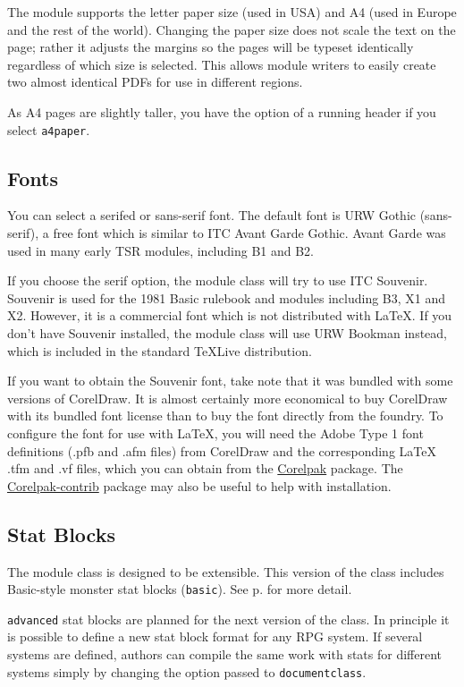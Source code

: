 \documentclass[letterpaper,serif]{module}
\begin{document}
The module supports the letter paper size (used in USA) and A4 (used in Europe and the rest of the world). Changing the paper size
does not scale the text on the page; rather it adjusts the margins so the pages will be typeset identically regardless
of which size is selected. This allows module writers to easily create two almost identical PDFs for use in different regions.

As A4 pages are slightly taller, you have the option of a running header if you select \verb|a4paper|.

\subsection*{Fonts}

You can select a serifed or sans-serif font. The default font is URW Gothic (sans-serif), a free font which is similar to
ITC Avant Garde Gothic. Avant Garde was used in many early TSR modules, including B1 and B2.

If you choose the serif option, the module class will try to use ITC Souvenir. Souvenir is used for the 1981 Basic rulebook
and modules including B3, X1 and X2. However, it is a commercial font which is not distributed with \LaTeX. If you don't have
Souvenir installed, the module class will use URW Bookman instead, which is included in the standard \TeX Live distribution.

If you want to obtain the Souvenir font, take note that it was bundled with some versions of CorelDraw.
It is almost certainly more economical to buy CorelDraw with its bundled font license than to buy the font directly from the foundry.
To configure the font for use with \LaTeX, you will need the Adobe Type 1 font definitions (.pfb and .afm files) from CorelDraw
and the corresponding LaTeX .tfm and .vf files, which you can obtain from the \href{https://www.ctan.org/pkg/corelpak}{Corelpak} package. The
\href{https://www.ctan.org/pkg/corelpak-contrib}{Corelpak-contrib} package may also be useful to help with installation.

\subsection*{Stat Blocks}

The module class is designed to be extensible.
This version of the class includes Basic-style monster stat blocks (\verb|basic|). See p.\pageref{stat_blocks} for more detail.

\verb|advanced| stat blocks are planned for the next version of the class. In principle it is possible to define a new stat
block format for any RPG system. If several systems are defined, authors can compile the same work with stats for different
systems simply by changing the option passed to \verb|documentclass|.
\end{document}
